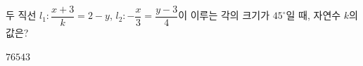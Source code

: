 두 직선 $l_1\colon \dfrac{x+3}{k}=2-y$, $l_2\colon -\dfrac{x}{3}=\dfrac{y-3}{4}$이 이루는 각의 크기가 $45^\circ$일 때, 자연수 $k$의 값은?
\begin{choices32}{$7$}{$6$}{$5$}{$4$}{$3$}\end{choices32}
